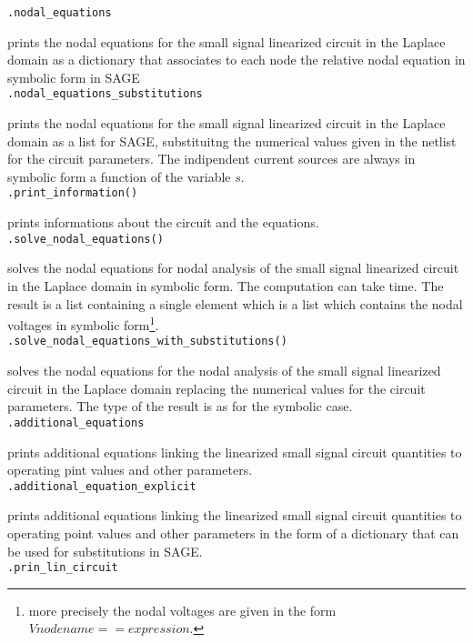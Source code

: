 \documentclass[a4paper]{article}
\begin{document}
{\tt .nodal\_equations}

prints the nodal equations for the small signal linearized circuit in the Laplace domain as a dictionary that associates to each node the relative nodal equation in symbolic form in SAGE\\

{\tt .nodal\_equations\_substitutions}

prints the nodal equations for the small signal linearized circuit in the Laplace domain as a list for SAGE, substituitng the numerical values given in the netlist for the circuit parameters. The indipendent current sources are always in symbolic form a function of the variable $s$.\\

{\tt .print\_information()}

prints informations about the circuit and the equations.\\

{\tt .solve\_nodal\_equations()}

solves the nodal equations for nodal analysis of the small signal linearized circuit in the Laplace domain in symbolic form. The computation can take time. The result is a list containing a single element which is a list which contains the nodal voltages in symbolic form\footnote{more precisely the nodal voltages are given in the form $Vnodename == expression$.}.\\

{\tt .solve\_nodal\_equations\_with\_substitutions()}

solves the nodal equations for the nodal analysis of the small signal linearized circuit in the Laplace domain replacing the numerical values for the circuit parameters. The type of the result is as for the symbolic case. \\

{\tt .additional\_equations}

prints additional equations linking the linearized small signal circuit quantities to operating pint values and other parameters.\\

{\tt .additional\_equation\_explicit}

prints additional equations linking the linearized small signal circuit quantities to operating point values and other parameters in the form of a dictionary that can be used for substitutions in SAGE.\\

{\tt .prin\_lin\_circuit}
\end{document}
